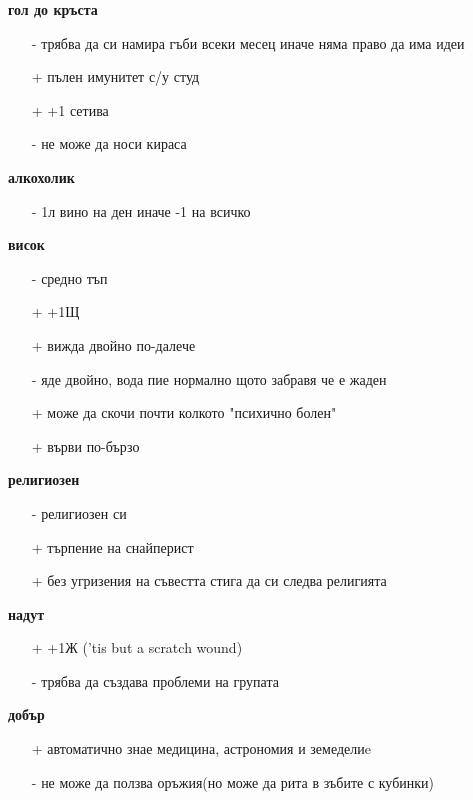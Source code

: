 \documentclass{article}
\begin{document}
\textbf{гол до кръста}
\begin{itemize}
\item[-] трябва да си намира гъби всеки месец иначе няма право да има идеи
\item[+] пълен имунитет с/у студ
\item[+] +1 сетива
\item[-] не може да носи кираса  \\
\end{itemize}

\textbf{алкохолик}
\begin{itemize}
\item[-] 1л вино на ден иначе -1 на всичко  \\
\end{itemize}

\textbf{висок}
\begin{itemize}
\item[-] средно тъп
\item[+] +1Щ
\item[+] вижда двойно по-далече
\item[-] яде двойно, вода пие нормално щото забравя че е жаден
\item[+] може да скочи почти колкото "психично болен"
\item[+] върви по-бързо  \\
\end{itemize}

\textbf{религиозен}
\begin{itemize}
\item[-] религиозен си
\item[+] търпение на снайперист
\item[+] без угризения на съвестта стига да си следва религията  \\
\end{itemize}

\textbf{надут}
\begin{itemize}
\item[+] +1Ж ('tis but a scratch wound)
\item[-] трябва да създава проблеми на групата  \\
\end{itemize}

\textbf{добър}
\begin{itemize}
\item[+] автоматично знае медицина, астрономия и земеделиe
\item[-] не може да ползва оръжия(но може да рита в зъбите с кубинки)  \\
\end{itemize}
\end{document}
